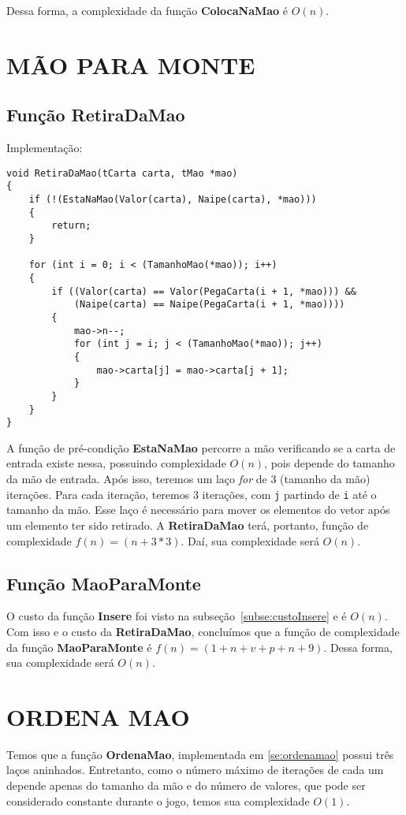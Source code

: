 \documentclass[12pt, oneside, a4paper, brazil]{abntex2}
\begin{document}
Dessa forma, a complexidade da função \textbf{ColocaNaMao} é $O(n)$.

\section{MÃO PARA MONTE}
\subsection{Função RetiraDaMao}
Implementação:
\begin{lstlisting}
void RetiraDaMao(tCarta carta, tMao *mao)
{
    if (!(EstaNaMao(Valor(carta), Naipe(carta), *mao)))
    {
        return;
    }

    for (int i = 0; i < (TamanhoMao(*mao)); i++)
    {
        if ((Valor(carta) == Valor(PegaCarta(i + 1, *mao))) &&
            (Naipe(carta) == Naipe(PegaCarta(i + 1, *mao))))
        {
            mao->n--;
            for (int j = i; j < (TamanhoMao(*mao)); j++)
            {
                mao->carta[j] = mao->carta[j + 1];
            }
        }
    }
}
\end{lstlisting}
A função de pré-condição \textbf{EstaNaMao} percorre a mão verificando se a carta de entrada existe nessa, possuindo complexidade $O(n)$, pois depende do tamanho da mão de entrada.
Após isso, teremos um laço \textit{for} de 3 (tamanho da mão) iterações. Para cada iteração, teremos 3 iterações, com \texttt{j} partindo de \texttt{i} até o tamanho da mão. Esse laço é necessário para mover os elementos do vetor após um elemento ter sido retirado.
A \textbf{RetiraDaMao} terá, portanto, função de complexidade $f (n) = (n + 3 * 3)$. Daí, sua complexidade será $O(n)$.

\subsection{Função MaoParaMonte}
O custo da função \textbf{Insere} foi visto na subseção~\ref{subse:custoInsere} e é $O(n)$. Com isso e o custo da \textbf{RetiraDaMao}, concluímos que a função de complexidade da função \textbf{MaoParaMonte} é $ f(n) = (1 + n + v + p + n + 9)$. Dessa forma, sua complexidade será $O(n)$.


\section{ORDENA MAO}

Temos que a função \textbf{OrdenaMao}, implementada em \ref{se:ordenamao} possui três laços aninhados. Entretanto, como o número máximo de iterações de cada um depende apenas do tamanho da mão e do número de valores, que pode ser considerado constante durante o jogo, temos sua complexidade $O(1)$.
\end{document}
